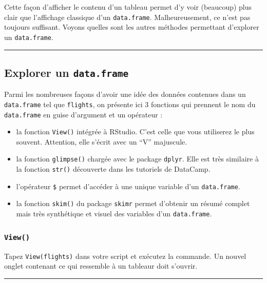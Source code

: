 \documentclass[
  a4paper,
]{article}
\providecommand{\tightlist}{%
  \setlength{\itemsep}{0pt}\setlength{\parskip}{0pt}}
\begin{document}
Cette façon d'afficher le contenu d'un tableau permet d'y voir (beaucoup) plus clair que l'affichage classique d'un \texttt{data.frame}. Malheureusement, ce n'est pas toujours suffisant. Voyons quelles sont les autres méthodes permettant d'explorer un \texttt{data.frame}.

\begin{center}\rule{0.5\linewidth}{0.5pt}\end{center}

\hypertarget{explorer-un-data.frame}{%
\subsection{\texorpdfstring{Explorer un \texttt{data.frame}}{Explorer un data.frame}}\label{explorer-un-data.frame}}

Parmi les nombreuses façons d'avoir une idée des données contenues dans un \texttt{data.frame} tel que \texttt{flights}, on présente ici 3 fonctions qui prennent le nom du \texttt{data.frame} en guise d'argument et un opérateur :

\begin{itemize}
\tightlist
\item
  la fonction \texttt{View()} intégrée à RStudio. C'est celle que vous utiliserez le plus souvent. Attention, elle s'écrit avec un ``V'' majuscule.
\item
  la fonction \texttt{glimpse()} chargée avec le package \texttt{dplyr}. Elle est très similaire à la fonction \texttt{str()} découverte dans les tutoriels de DataCamp.
\item
  l'opérateur \texttt{\$} permet d'accéder à une unique variable d'un \texttt{data.frame}.
\item
  la fonction \texttt{skim()} du package \texttt{skimr} permet d'obtenir un résumé complet mais très synthétique et visuel des variables d'un \texttt{data.frame}.
\end{itemize}

\hypertarget{View}{%
\subsubsection{\texorpdfstring{\texttt{View()}}{View()}}\label{View}}

Tapez \texttt{View(flights)} dans votre script et exécutez la commande. Un nouvel onglet contenant ce qui ressemble à un tableaur doit s'ouvrir.

\begin{center}\rule{0.5\linewidth}{0.5pt}\end{center}
\end{document}
